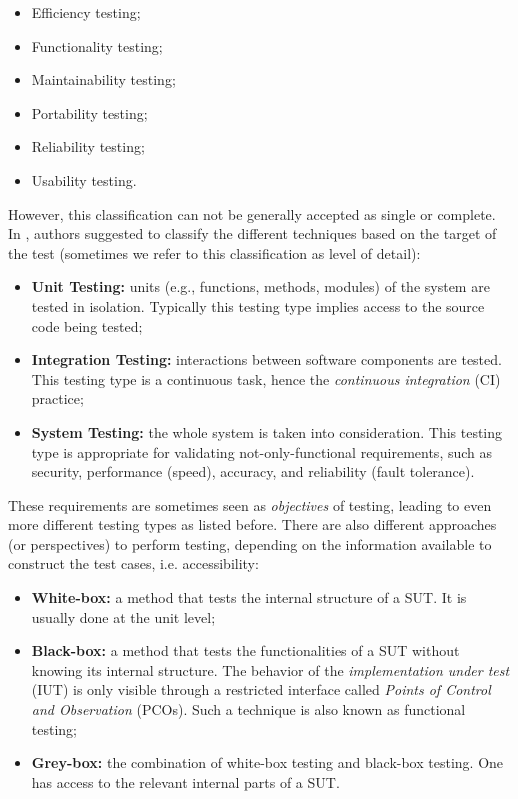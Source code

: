 \begin{itemize}
\item Efficiency testing;
\item Functionality testing;
\item Maintainability testing;
\item Portability testing;
\item Reliability testing;
\item Usability testing.
\end{itemize}

However, this classification can not be generally accepted as
single or complete. In \cite{4425813}, authors suggested to
classify the different techniques based on the target of the
test (sometimes we refer to this classification as level of
detail):

\begin{itemize}
\item \textbf{Unit Testing:} units (e.g., functions, methods,
modules) of the system are tested in isolation. Typically this
testing type implies access to the source code being tested;

\item \textbf{Integration Testing:} interactions between software
components are tested. This testing type is a continuous task,
hence the \textit{continuous integration} (CI) practice;

\item \textbf{System Testing:} the whole system is taken into
consideration. This testing type is appropriate for validating
not-only-functional requirements, such as security, performance
(speed), accuracy, and reliability (fault tolerance).
\end{itemize}

These requirements are sometimes seen as \textit{objectives} of
testing, leading to even more different testing types as listed
before. There are also different approaches (or perspectives) to
perform testing, depending on the information available to
construct the test cases, i.e. accessibility:

\begin{itemize}
    \item \textbf{White-box:} a method that tests the internal
        structure of a SUT. It is usually done at the unit level;

    \item \textbf{Black-box:} a method that tests the functionalities
        of a SUT without knowing its internal structure. The behavior
        of the \textit{implementation under test} (IUT) is only
        visible through a restricted interface called \textit{Points
        of Control and Observation} (PCOs). Such a technique is also
        known as functional testing;

    \item \textbf{Grey-box:} the combination of white-box testing and
        black-box testing. One has access to the relevant internal
        parts of a SUT.
\end{itemize}

